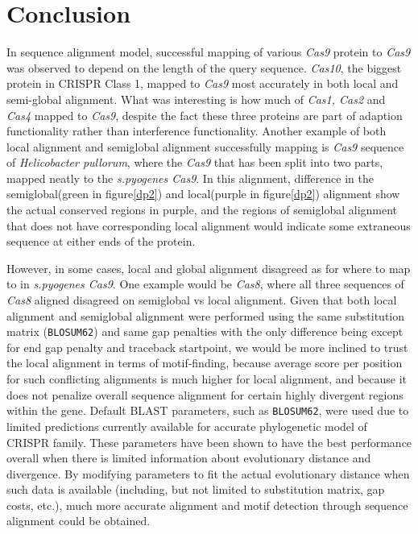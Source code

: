 \documentclass[11pt, oneside]{article}
\begin{document}
\section{Conclusion}

In sequence alignment model, successful mapping of various \textit{Cas9} protein to \textit{Cas9} was observed to depend on the length of the query sequence. \textit{Cas10}, the biggest protein in CRISPR Class 1, mapped to \textit{Cas9} most accurately in both local and semi-global alignment. What was interesting is how much of \textit{Cas1, Cas2} and \textit{Cas4} mapped to \textit{Cas9}, despite the fact these three proteins are part of adaption functionality rather than interference functionality\cite{cas:makarova}. Another example of both local alignment and semiglobal alignment successfully mapping is \textit{Cas9} sequence of \textit{Helicobacter pullorum}, where the \textit{Cas9} that has been split into two parts, mapped neatly to the \textit{s.pyogenes Cas9}. In this alignment, difference in the semiglobal(green in figure\ref{dp2}) and local(purple in figure\ref{dp2}) alignment show the actual conserved regions in purple, and the regions of semiglobal alignment that does not have corresponding local alignment would indicate some extraneous sequence at either ends of the protein. 


However, in some cases, local and global alignment disagreed as for where to map to in \textit{s.pyogenes Cas9}. One example would be \textit{Cas8}, where all three sequences of \textit{Cas8} aligned disagreed on semiglobal vs local alignment. Given that both local alignment and semiglobal alignment were performed using the same substitution matrix (\texttt{BLOSUM62}) and same gap penalties with the only difference being except for end gap penalty and traceback startpoint, we would be more inclined to trust the local alignment in terms of motif-finding, because average score per position for such conflicting alignments is much higher for local alignment, and because it does not penalize overall sequence alignment for certain highly divergent regions within the gene. Default BLAST parameters, such as \texttt{BLOSUM62}, were used due to limited predictions currently available for accurate phylogenetic model of CRISPR family. These parameters have been shown to have the best performance overall when there is limited information about evolutionary distance and divergence. By modifying parameters to fit the actual evolutionary distance when such data is available (including, but not limited to substitution matrix, gap costs, etc.), much more accurate alignment and motif detection through sequence alignment could be obtained.
\end{document}
